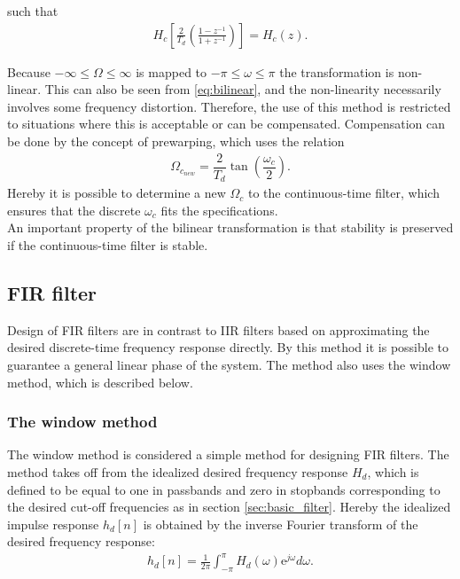 such that 
\begin{align} \label{eq:bilinear}
H_c\left[\frac{2}{T_d}\left(\frac{1-z^{-1}}{1+z^{-1}}\right)\right]=H_c(z). 
\end{align}

Because $-\infty \leq \Omega \leq \infty $ is mapped to $-\pi \leq \omega \leq \pi$ the transformation is non-linear. This can also be seen from \eqref{eq:bilinear}, and the non-linearity necessarily involves some frequency distortion. Therefore, the use of this method is restricted to situations where this is acceptable or can be compensated. Compensation can be done by the concept of prewarping, which uses the relation
\begin{align*}
\Omega_{c_{new}} = \dfrac{2}{T_d} \tan \left( \dfrac{\omega_c}{2} \right).
\end{align*}
Hereby it is possible to determine a new $\Omega_c$ to the continuous-time filter, which ensures that the discrete $\omega_c$ fits the specifications. \\
An important property of the bilinear transformation is that stability is preserved if the continuous-time filter is stable.

\subsection{FIR filter} \label{subsec:FIR}
Design of FIR filters are in contrast to IIR filters based on approximating the desired discrete-time frequency response directly. By this method it is possible to guarantee a general linear phase of the system. The method also uses the window method, which is described below.

\subsubsection{The window method}
The window method is considered a simple method for designing FIR filters. The method takes off from the idealized desired frequency response $H_d$, which is defined to be equal to one in passbands and zero in stopbands corresponding to the desired cut-off frequencies as in section \ref{sec:basic_filter}. Hereby the idealized impulse response $h_d[n]$ is obtained by the inverse Fourier transform of the desired frequency response:
\begin{align*}
h_d[n]=\frac{1}{2\pi}\int_{-\pi}^{\pi} H_d(\omega)\text{e}^{j\omega} d\omega.
\end{align*}

